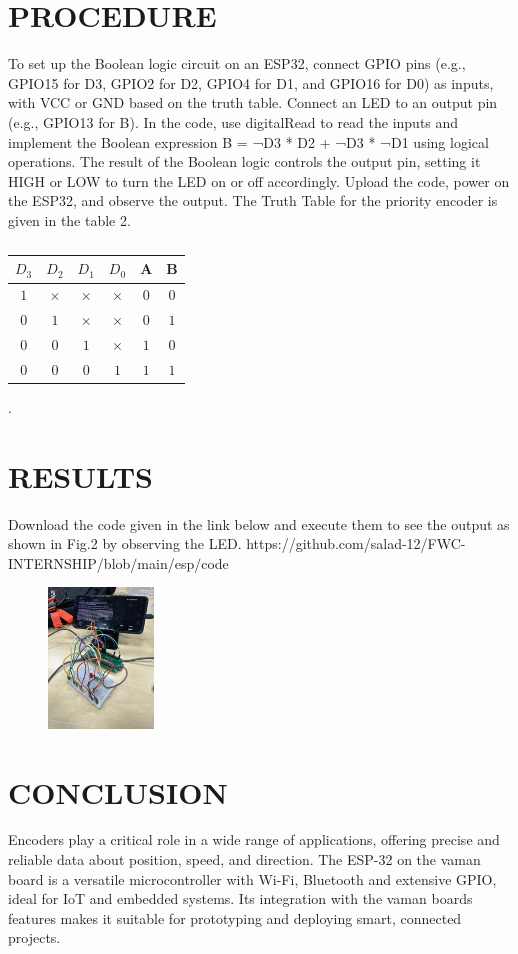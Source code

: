 \documentclass[conference]{IEEEtran}
\begin{document}
\section{PROCEDURE}
To set up the Boolean logic circuit on an ESP32, connect GPIO pins (e.g., GPIO15 for D3, GPIO2 for D2, GPIO4 for D1, and GPIO16 for D0) as inputs, with VCC or GND based on the truth table. Connect an LED to an output pin (e.g., GPIO13 for B). In the code, use digitalRead to read the inputs and implement the Boolean expression B = ¬D3 * D2 + ¬D3 * ¬D1 using logical operations. The result of the Boolean logic controls the output pin, setting it HIGH or LOW to turn the LED on or off accordingly. Upload the code, power on the ESP32, and observe the output. The Truth Table for the priority encoder is given in the table 2.
 \begin{table}[h]
	 \centering
	 \begin{tabular}{| c | c | c | c | c | c |} \hline
		 $D_{3}$ & $D_{2}$ & $D_{1}$& $D_{0}$ & A & B \\ \hline
		 $1$ & $\times$ & $\times$ & $\times$ & $0$ & $0$ \\ \hline
		 $0$ & $1$ & $\times$ & $\times$ & $0$ & $1$ \\ \hline
		 $0$ & $0$ & $1$ & $\times$ & $1$ & $0$ \\ \hline
		 $0$ & $0$ & $0$ & $1$ & $1$ & $1$ \\ 
		 \hline
		 \end{tabular}
		 \vspace{0.1cm}
		 \caption{\label{tab:widgets}}
 \end{table}.

\section{RESULTS}
Download the code given in the link below and execute them to see the output as shown in Fig.2 by observing the LED. 
https://github.com/salad-12/FWC-INTERNSHIP/blob/main/esp/code%
\begin{figure}[h] 
	\centering 
	\includegraphics[width=0.25\textwidth]{espp.jpg}
	\caption{\label{fig:Gates}}    
\end{figure}
\newpage
\section{CONCLUSION}
Encoders play a critical role in a wide range of applications, offering precise and reliable data about position, speed, and direction. The ESP-32 on the vaman board is a versatile microcontroller with Wi-Fi, Bluetooth and extensive GPIO, ideal for IoT and embedded systems. Its integration with the vaman boards features makes it suitable for prototyping and deploying smart, connected projects. 
\end{document}
